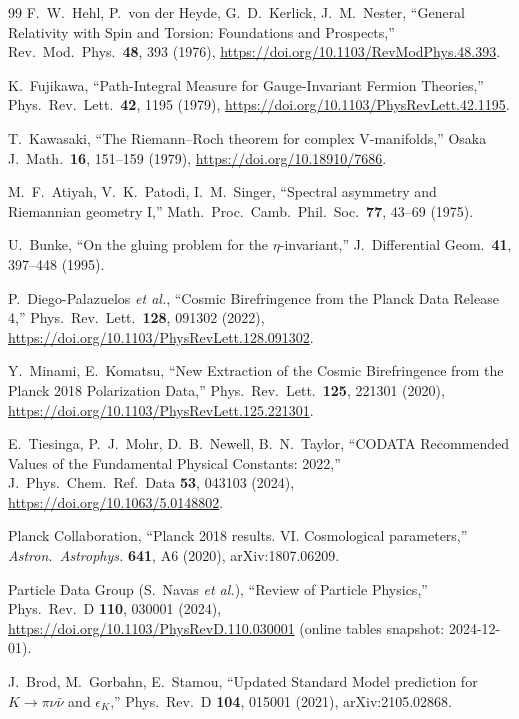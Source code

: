 \begin{thebibliography}{99}
F.~W.~Hehl, P.~von der Heyde, G.~D.~Kerlick, J.~M.~Nester,
``General Relativity with Spin and Torsion: Foundations and Prospects,''
Rev.\ Mod.\ Phys.\ \textbf{48}, 393 (1976),
\url{https://doi.org/10.1103/RevModPhys.48.393}.

K.~Fujikawa,
``Path-Integral Measure for Gauge-Invariant Fermion Theories,''
Phys.\ Rev.\ Lett.\ \textbf{42}, 1195 (1979),
\url{https://doi.org/10.1103/PhysRevLett.42.1195}.

T.~Kawasaki,
``The Riemann--Roch theorem for complex V-manifolds,''
Osaka J.\ Math.\ \textbf{16}, 151--159 (1979),
\url{https://doi.org/10.18910/7686}.

M.~F.~Atiyah, V.~K.~Patodi, I.~M.~Singer,
``Spectral asymmetry and Riemannian geometry I,''
Math.\ Proc.\ Camb.\ Phil.\ Soc.\ \textbf{77}, 43--69 (1975).

U.~Bunke,
``On the gluing problem for the $\eta$-invariant,''
J.\ Differential Geom.\ \textbf{41}, 397--448 (1995).

P.~Diego-Palazuelos \textit{et al.},
``Cosmic Birefringence from the Planck Data Release 4,''
Phys.\ Rev.\ Lett.\ \textbf{128}, 091302 (2022),
\url{https://doi.org/10.1103/PhysRevLett.128.091302}.

Y.~Minami, E.~Komatsu,
``New Extraction of the Cosmic Birefringence from the Planck 2018 Polarization Data,''
Phys.\ Rev.\ Lett.\ \textbf{125}, 221301 (2020),
\url{https://doi.org/10.1103/PhysRevLett.125.221301}.

E.~Tiesinga, P.~J.~Mohr, D.~B.~Newell, B.~N.~Taylor,
``CODATA Recommended Values of the Fundamental Physical Constants: 2022,''
J.\ Phys.\ Chem.\ Ref.\ Data \textbf{53}, 043103 (2024),
\url{https://doi.org/10.1063/5.0148802}.

Planck Collaboration,
``Planck 2018 results. VI. Cosmological parameters,''
\textit{Astron.\ Astrophys.} \textbf{641}, A6 (2020), arXiv:1807.06209.

Particle Data Group (S.~Navas \textit{et al.}),
``Review of Particle Physics,''
Phys.\ Rev.\ D \textbf{110}, 030001 (2024),
\url{https://doi.org/10.1103/PhysRevD.110.030001}
(online tables snapshot: 2024-12-01).

J.~Brod, M.~Gorbahn, E.~Stamou,
``Updated Standard Model prediction for $K\to\pi\nu\bar{\nu}$ and $\epsilon_K$,''
Phys.\ Rev.\ D \textbf{104}, 015001 (2021), arXiv:2105.02868.


\end{thebibliography}
